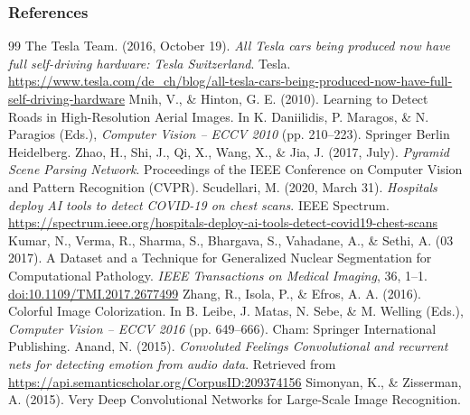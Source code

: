 \documentclass[11pt,compress,t,notes=noshow, xcolor=table]{beamer}
\begin{document}
\begin{vbframe}
\frametitle{References}
\footnotesize{
\begin{thebibliography}{99}
 The Tesla Team. (2016, October 19). \textit{All Tesla cars being produced now have full self-driving hardware: Tesla Switzerland}. Tesla. \url{https://www.tesla.com/de_ch/blog/all-tesla-cars-being-produced-now-have-full-self-driving-hardware}
 Mnih, V., \& Hinton, G. E. (2010). Learning to Detect Roads in High-Resolution Aerial Images. In K. Daniilidis, P. Maragos, \& N. Paragios (Eds.), \textit{Computer Vision – ECCV 2010} (pp. 210–223). Springer Berlin Heidelberg.
 Zhao, H., Shi, J., Qi, X., Wang, X., \& Jia, J. (2017, July). \textit{Pyramid Scene Parsing Network}. Proceedings of the IEEE Conference on Computer Vision and Pattern Recognition (CVPR).
 Scudellari, M. (2020, March 31). \textit{Hospitals deploy AI tools to detect COVID-19 on chest scans}. IEEE Spectrum.  \url{https://spectrum.ieee.org/hospitals-deploy-ai-tools-detect-covid19-chest-scans}
Kumar, N., Verma, R., Sharma, S., Bhargava, S., Vahadane, A., \& Sethi, A. (03 2017). A Dataset and a Technique for Generalized Nuclear Segmentation for Computational Pathology. \textit{IEEE Transactions on Medical Imaging}, 36, 1–1. \url{doi:10.1109/TMI.2017.2677499}
 Zhang, R., Isola, P., \& Efros, A. A. (2016). Colorful Image Colorization. In B. Leibe, J. Matas, N. Sebe, \& M. Welling (Eds.), \textit{Computer Vision -- ECCV 2016} (pp. 649–666). Cham: Springer International Publishing.
 Anand, N. (2015). \textit{Convoluted Feelings Convolutional and recurrent nets for detecting emotion from audio data}. Retrieved from \url{https://api.semanticscholar.org/CorpusID:209374156}
 Simonyan, K., \& Zisserman, A. (2015). Very Deep Convolutional Networks for Large-Scale Image Recognition.
\end{thebibliography}
}
\end{vbframe}

\endlecture
\end{document}
